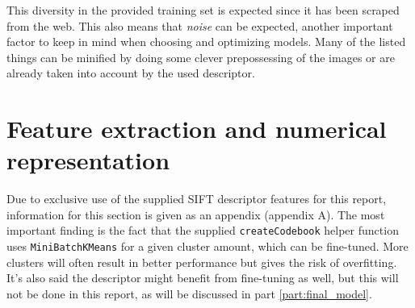 This diversity in the provided training set is expected since it has been scraped from the web.
This also means that \emph{noise} can be expected, another important factor to keep in mind when choosing and optimizing models.
Many of the listed things can be minified by doing some clever prepossessing of the images or are already taken into account by the used descriptor.



\section{Feature extraction and numerical representation}
\label{section:DA_feature_extraction_and_nr_rep}

Due to exclusive use of the supplied SIFT descriptor features for this report, information for this section is given as an appendix (appendix A).
The most important finding is the fact that the supplied \texttt{createCodebook} helper function uses \texttt{MiniBatchKMeans} for a given cluster amount, which can be fine-tuned.
More clusters will often result in better performance but gives the risk of overfitting.
It's also said the descriptor might benefit from fine-tuning as well, but this will not be done in this report, as will be discussed in part \ref{part:final_model}.

